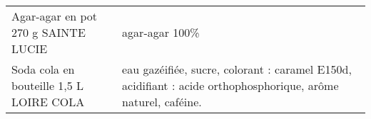 \begin{longtable}{p{5cm}p{10cm}}
                                                                      Agar-agar en pot 270 g SAINTE LUCIE &                                                                                                                                                                                                                                                                                                                                                                                                                                                                                                                                                                                                                                                                                                                                                                                                                                                                                                                                                                                                                           agar-agar 100\% \\
                                                                  Soda cola en bouteille 1,5 L LOIRE COLA &                                                                                                                                                                                                                                                                                                                                                                                                                                                                                                                                                                                                                                                                                                                                                                                                                                                                                                                            eau gazéifiée, sucre, colorant : caramel E150d, acidifiant : acide orthophosphorique, arôme naturel, caféine. \\

\end{longtable}
